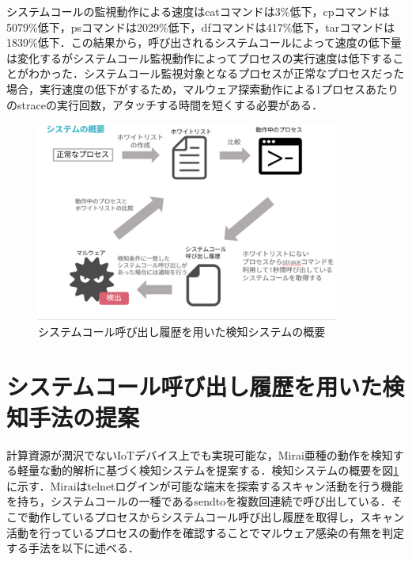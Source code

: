 システムコールの監視動作による速度はcatコマンドは3\%低下，cpコマンドは5079\%低下，psコマンドは2029\%低下，dfコマンドは417\%低下，tarコマンドは1839\%低下．この結果から，呼び出されるシステムコールによって速度の低下量は変化するがシステムコール監視動作によってプロセスの実行速度は低下することがわかった．システムコール監視対象となるプロセスが正常なプロセスだった場合，実行速度の低下がするため，マルウェア探索動作による1プロセスあたりのstraceの実行回数，アタッチする時間を短くする必要がある．




\begin{figure}[h]
   \centering
      \includegraphics[width=100mm]{figures/strace.eps}
  \caption{システムコール呼び出し履歴を用いた検知システムの概要}
  \label{fig:strace}
\end{figure}

\section{システムコール呼び出し履歴を用いた検知手法の提案}
計算資源が潤沢でないIoTデバイス上でも実現可能な，Mirai亜種の動作を検知する軽量な動的解析に基づく検知システムを提案する．検知システムの概要を図\ref{fig:strace}に示す．Miraiはtelnetログインが可能な端末を探索するスキャン活動を行う機能を持ち，システムコールの一種であるsendtoを複数回連続で呼び出している．そこで動作しているプロセスからシステムコール呼び出し履歴を取得し，スキャン活動を行っているプロセスの動作を確認することでマルウェア感染の有無を判定する手法を以下に述べる．

